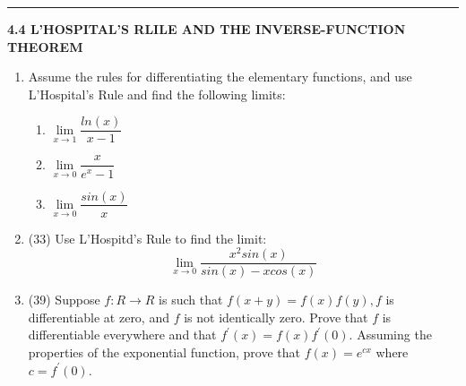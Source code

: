 \documentclass[fleqn]{article}
\begin{document}
  \rule{15cm}{1pt}

  \textbf{4.4 L'HOSPITAL'S RLILE AND THE INVERSE-FUNCTION THEOREM}
  \begin{enumerate}
    \item Assume the rules for differentiating the elementary functions, and use L'Hospital's Rule
    and find the following limits: 
    \begin{enumerate}
      \item $\lim\limits_{x \to 1} \dfrac{ln(x)}{x-1}$



      \item $\lim\limits_{x \to 0} \dfrac{x}{e^x-1}$



      \item $\lim\limits_{x \to 0} \dfrac{sin(x)}{x}$



    \end{enumerate}

    \item (33) Use L'Hospitd's Rule to find the limit:
    $$
      \lim\limits_{x \to 0} \dfrac{x^2 sin(x)}{sin(x)-x cos(x)}
    $$



    \item (39) Suppose $f: R \longrightarrow R$ is such that $f(x+y)=f(x)f(y), f$ is differentiable at zero, and $f$ is
    not identically zero. Prove that $f$ is differentiable everywhere and that $f^'(x)=f(x)f^'(0)$.
    Assuming the properties of the exponential function, prove that $f(x)=e^{cx}$ where $c=f^'(0)$.



  \end{enumerate}
\end{document}
